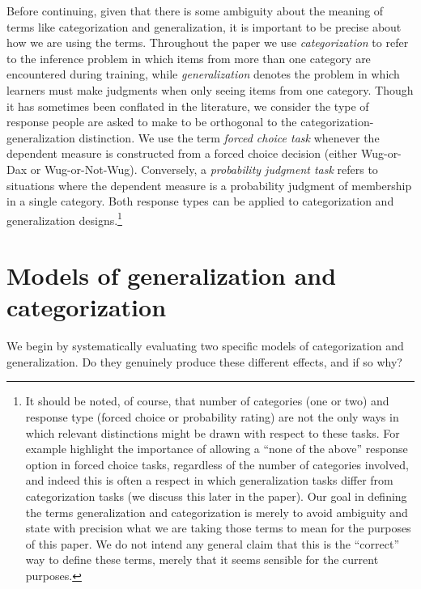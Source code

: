 \documentclass[doc,apacite]{apa6}
\begin{document}
Before continuing, given that there is some ambiguity about the meaning of terms like categorization and generalization, it is important to be precise about how we are using the terms. Throughout the paper we use {\it categorization} to refer to the inference problem in which items from more than one category are encountered during training, while {\it generalization} denotes the problem in which learners must make judgments when only seeing items from one category. Though it has sometimes been conflated in the literature, we consider the type of response people are asked to make to be orthogonal to the categorization-generalization distinction.
We use the term {\it forced choice task} whenever the dependent measure is constructed from a forced choice decision (either Wug-or-Dax or Wug-or-Not-Wug). Conversely, a {\it probability judgment task} refers to situations where the dependent measure is a probability judgment of membership in a single category. Both response types can be applied to categorization and generalization designs.\footnote{It should be noted, of course, that number of categories (one or two) and response type (forced choice or probability rating) are not the only ways in which relevant distinctions might be drawn with respect to these tasks. For example  highlight the importance of allowing a ``none of the above'' response option in forced choice tasks, regardless of the number of categories involved, and indeed this is often a respect in which generalization tasks differ from categorization tasks (we discuss this later in the paper). Our goal in defining the terms generalization and categorization is merely to avoid ambiguity and state with precision what we are taking those terms to mean for the purposes of this paper. We do not intend any  general claim that this is the ``correct'' way to define these terms, merely that it seems sensible for the current purposes.}

\section{Models of generalization and categorization}

We begin by systematically evaluating two specific models of categorization and generalization. Do they genuinely produce these different effects, and if so why? 
\end{document}
